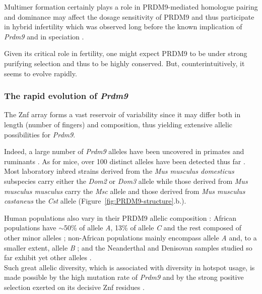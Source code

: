 Multimer formation certainly plays a role in PRDM9-mediated homologue pairing \citep{davies2016reengineering} and dominance may affect the dosage sensitivity of PRDM9 \citep{flachs2012interallelic, segurel2011case} and thus participate in hybrid infertility which was observed long before the known implication of \textit{Prdm9} \citep{forejt1974genetic} and in speciation \citep{mihola2009mouse}.

Given its critical role in fertility, one might expect PRDM9 to be under strong purifying selection and thus to be highly conserved. 
But, counterintuitively, it seems to evolve rapidly.


\subsubsection{The rapid evolution of \textit{Prdm9}}

The Znf array forms a vast reservoir of variability since it may differ both in length (number of fingers) and composition, thus yielding extensive allelic possibilities for \textit{Prdm9}.

Indeed, a large number of \textit{Prdm9} alleles have been uncovered in primates \citep{groeneveld2012high,heerschop2016pioneering} and ruminants \citep{ahlawat2016zinc}.
As for mice, over 100 distinct alleles have been detected thus far \citep{buard2014diversity, kono2014prdm9}.
Most laboratory inbred strains derived from the \textit{Mus musculus domesticus} subspecies carry either the \textit{Dom2} or \textit{Dom3} allele while those derived from \textit{Mus musculus musculus} carry the \textit{Msc} allele and those derived from \textit{Mus musculus castaneus} the \textit{Cst} allele (Figure~\ref{fig:PRDM9-structure}.b.).

Human populations also vary in their PRDM9 allelic composition \citep{berg2010prdm9, berg2011variants, fledel-alon2011variation}: African populations have $\sim$50\% of allele \textit{A}, 13\% of allele \textit{C} and the rest composed of other minor alleles \citep{berg2011variants}; non-African populations mainly encompass allele \textit{A} and, to a smaller extent, allele \textit{B} \citep{baudat2010prdm9,berg2010prdm9,hinch2011landscape}; and the Neanderthal and Denisovan samples studied so far exhibit yet other alleles \citep{schwartz2014primate,lesecque2014red}.\\

Such great allelic diversity, which is associated with diversity in hotspot usage, is made possible by the high mutation rate of \textit{Prdm9} \citep{jeffreys2013recombination} and by the strong positive selection exerted on its decisive Znf residues \citep{oliver2009accelerated,thomas2009extraordinary,ponting2011what}.




